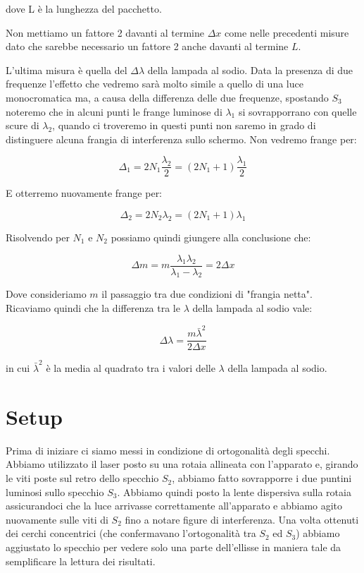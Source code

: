 \documentclass{article}
\begin{document}
dove L è la lunghezza del pacchetto.

Non mettiamo un fattore 2 davanti al termine $\Delta{x}$ come nelle precedenti misure dato che sarebbe necessario un fattore 2 anche davanti al termine $L$.

\vspace{3mm}

L'ultima misura è quella del $\Delta\lambda$ della lampada al sodio. Data la presenza di due frequenze l'effetto che vedremo sarà molto simile a quello di una luce monocromatica ma, a causa della differenza delle due frequenze, spostando $S_3$ noteremo che in alcuni punti le frange luminose di $\lambda_1$ si sovrapporrano con quelle scure di $\lambda_2$, quando ci troveremo in questi punti non saremo in grado di distinguere alcuna frangia di interferenza sullo schermo. Non vedremo frange per:

\begin{equation} 
\Delta_1 = 2 N_1 \frac{\lambda_2}{2} = (2 N_1 + 1) \frac{\lambda_1}{2} 
\end{equation}

E otterremo nuovamente frange per:

\begin{equation} 
\Delta_2 = 2N_2 \lambda_2 =(2 N_1 + 1) \lambda_1 
\end{equation}

Risolvendo per $N_1$ e $N_2$ possiamo quindi giungere alla conclusione che:

\begin{equation} 
\Delta m = m \frac{\lambda_1 \lambda_2}{\lambda_1 {-} \lambda_2} = 2 \Delta{x} 
\end{equation}

Dove consideriamo $m$ il passaggio tra due condizioni di "frangia netta". Ricaviamo quindi che la differenza tra le $\lambda$ della lampada al sodio vale:

\begin{equation} 
\Delta{\lambda} = \frac{m \bar \lambda^2}{2 \Delta{x}} 
\end{equation}

in cui $ \bar \lambda^2$ è la media al quadrato tra i valori delle $\lambda$ della lampada al sodio.




\section{Setup}
Prima di iniziare ci siamo messi in condizione di ortogonalità degli specchi. Abbiamo utilizzato il laser posto su una rotaia allineata con l'apparato e, girando le viti poste sul retro dello specchio $S_2$, abbiamo fatto sovrapporre i due puntini luminosi sullo specchio $S_3$. Abbiamo quindi posto la lente dispersiva sulla rotaia assicurandoci che la luce arrivasse correttamente all'apparato e abbiamo agito nuovamente sulle viti di $S_2$ fino a notare figure di interferenza. Una volta ottenuti dei cerchi concentrici (che confermavano l'ortogonalità tra $S_2$ ed $S_3$) abbiamo aggiustato lo specchio per vedere solo una parte dell'ellisse in maniera tale da semplificare la lettura dei risultati.
\end{document}
